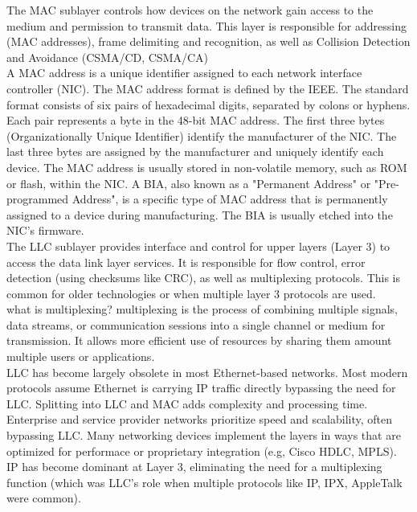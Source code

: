 \documentclass[parindent=0pt]{article}
\begin{document}
The MAC sublayer controls how devices on the network gain access to the medium and permission to transmit data. This layer is responsible for addressing (MAC addresses), frame delimiting and recognition, as well as Collision Detection and Avoidance (CSMA/CD, CSMA/CA)\\

A MAC address is a unique identifier assigned to each network interface controller (NIC). The MAC address format is defined by the IEEE. The standard format consists of six pairs of hexadecimal digits, separated by colons or hyphens. Each pair represents a byte in the 48-bit MAC address. The first three bytes (Organizationally Unique Identifier) identify the manufacturer of the NIC. The last three bytes are assigned by the manufacturer and uniquely identify each device. The MAC address is usually stored in non-volatile memory, such as ROM or flash, within the NIC. A BIA, also known as a "Permanent Address" or "Pre-programmed Address", is a specific type of MAC address that is permanently assigned to a device during manufacturing. The BIA is usually etched into the NIC's firmware.\\

The LLC sublayer provides interface and control for upper layers (Layer 3) to access the data link layer services. It is responsible for flow control, error detection (using checksums like CRC), as well as multiplexing protocols. This is common for older technologies or when multiple layer 3 protocols are used.\\
what is multiplexing? multiplexing is the process of combining multiple signals, data streams, or communication sessions into a single channel or medium for transmission. It allows more efficient use of resources by sharing them amount multiple users or applications.\\

LLC has become largely obsolete in most Ethernet-based networks. Most modern protocols assume Ethernet is carrying IP traffic directly bypassing the need for LLC. Splitting into LLC and MAC adds complexity and processing time. Enterprise and service provider networks prioritize speed and scalability, often bypassing LLC. Many networking devices implement the layers in ways that are optimized for performace or proprietary integration (e.g, Cisco HDLC, MPLS). IP has become dominant at Layer 3, eliminating the need for a multiplexing function (which was LLC's role when multiple protocols like IP, IPX, AppleTalk were common).\\
\end{document}
